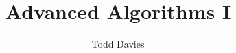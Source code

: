\newcommand{\coursename}{Advanced Algorithms I}
\newcommand{\coursecode}{COMP36111}
\newcommand{\courseinfo}{}
\newcommand{\Author}{Todd Davies} 
\newcommand{\Title}{Advanced Algorithms I}
\author{\Author}
\title{\Title}
